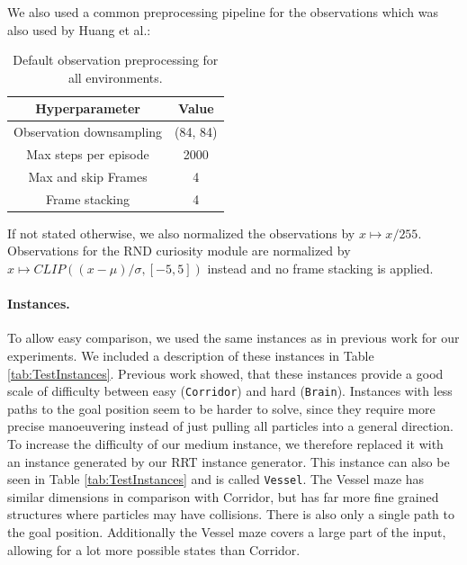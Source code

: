 We also used a common preprocessing pipeline for the observations which was also used by Huang et al.:

\begin{table} [h]
    \begin{center}
        \begin{tabular}{|c|c|}
            \hline
            Hyperparameter & Value \\
            \hline
            Observation downsampling & (84, 84) \\
            Max steps per episode & 2000 \\
            Max and skip Frames & 4 \\
            Frame stacking & 4 \\
            \hline
        \end{tabular}
    \end{center}
    \caption[Default Observation Preprocessing]{Default observation preprocessing for all environments.} \label{tab:RNDParameters}
\end{table}

If not stated otherwise, we also normalized the observations by $x \mapsto x/255$. Observations for the RND curiosity module are normalized by $x \mapsto CLIP((x-\mu)/\sigma, [-5, 5])$ instead and no frame stacking is applied.


\paragraph{Instances.}
To allow easy comparison, we used the same instances as in previous work for our experiments. We included a description of these instances in Table \ref{tab:TestInstances}. Previous work showed, that these instances provide a good scale of difficulty between easy (\texttt{Corridor}) and hard (\texttt{Brain}). Instances with less paths to the goal position seem to be harder to solve, since they require more precise manoeuvering instead of just pulling all particles into a general direction. To increase the difficulty of our medium instance, we therefore replaced it with an instance generated by our RRT instance generator. This instance can also be seen in Table \ref{tab:TestInstances} and is called \texttt{Vessel}. The Vessel maze has similar dimensions in comparison with Corridor, but has far more fine grained structures where particles may have collisions. There is also only a single path to the goal position. Additionally the Vessel maze covers a large part of the input, allowing for a lot more possible states than Corridor. 


